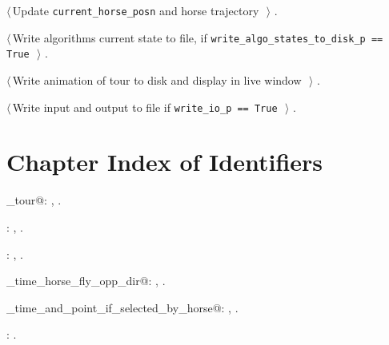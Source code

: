 \documentclass[11.5pt]{report}
\begin{document}
{\begin{list}{}{\setlength{\itemsep}{-\parsep}\setlength{\itemindent}{-\leftmargin}}
\item $\langle\,$Update \verb|current_horse_posn| and horse trajectory\nobreak\ {\footnotesize {}}$\,\rangle$ {\footnotesize {\NWtxtRefIn} .}
\item $\langle\,$Write algorithms current state to file, if \verb|write_algo_states_to_disk_p == True|\nobreak\ {\footnotesize {}}$\,\rangle$ {\footnotesize {\NWtxtRefIn} .}
\item $\langle\,$Write animation of tour to disk and display in live window\nobreak\ {\footnotesize {}}$\,\rangle$ {\footnotesize {\NWtxtRefIn} .}
\item $\langle\,$Write input and output to file if \verb|write_io_p == True|\nobreak\ {\footnotesize {}}$\,\rangle$ {\footnotesize {\NWtxtRefIn} .}
\end{list}}
\section{Chapter Index of Identifiers}

{\small\begin{list}{}{\setlength{\itemsep}{-\parsep}\setlength{\itemindent}{-\leftmargin}}
\item \verb@animate_tour@: , \underline{}.
\item \verb@clearAllStates@: , \underline{}.
\item \verb@getTour@: , \underline{}.
\item \verb@meeting_time_horse_fly_opp_dir@: , \underline{}.
\item \verb@rendezvous_time_and_point_if_selected_by_horse@: , \underline{}.
\item \verb@wrapperkeyPressHandler@: \underline{}.
\end{list}} 

\newpage
\end{document}
